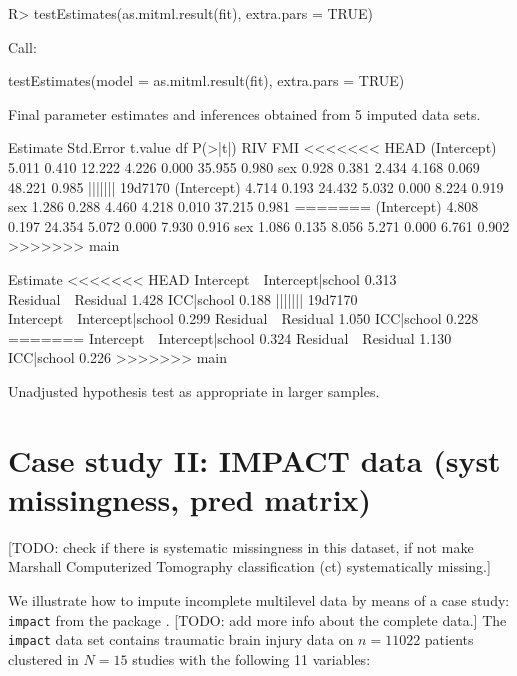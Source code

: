 \documentclass[
]{jss}
\begin{document}
\begin{CodeChunk}
\begin{CodeInput}
R> testEstimates(as.mitml.result(fit), extra.pars = TRUE)
\end{CodeInput}
\begin{CodeOutput}

Call:

testEstimates(model = as.mitml.result(fit), extra.pars = TRUE)

Final parameter estimates and inferences obtained from 5 imputed data sets.

             Estimate Std.Error   t.value        df   P(>|t|)       RIV       FMI 
<<<<<<< HEAD
(Intercept)     5.011     0.410    12.222     4.226     0.000    35.955     0.980 
sex             0.928     0.381     2.434     4.168     0.069    48.221     0.985 
||||||| 19d7170
(Intercept)     4.714     0.193    24.432     5.032     0.000     8.224     0.919 
sex             1.286     0.288     4.460     4.218     0.010    37.215     0.981 
=======
(Intercept)     4.808     0.197    24.354     5.072     0.000     7.930     0.916 
sex             1.086     0.135     8.056     5.271     0.000     6.761     0.902 
>>>>>>> main

                            Estimate 
<<<<<<< HEAD
Intercept~~Intercept|school    0.313 
Residual~~Residual             1.428 
ICC|school                     0.188 
||||||| 19d7170
Intercept~~Intercept|school    0.299 
Residual~~Residual             1.050 
ICC|school                     0.228 
=======
Intercept~~Intercept|school    0.324 
Residual~~Residual             1.130 
ICC|school                     0.226 
>>>>>>> main

Unadjusted hypothesis test as appropriate in larger samples.
\end{CodeOutput}
\end{CodeChunk}

\hypertarget{case-study-ii-impact-data-syst-missingness-pred-matrix}{%
\section{Case study II: IMPACT data (syst missingness, pred
matrix)}\label{case-study-ii-impact-data-syst-missingness-pred-matrix}}

{[}TODO: check if there is systematic missingness in this dataset, if
not make Marshall Computerized Tomography classification (ct)
systematically missing.{]}

We illustrate how to impute incomplete multilevel data by means of a
case study: \texttt{impact} from the  package
\citep[empirical data on traumatic brain injuries, \(n = 11,022\) units
across \(N = 15\) clusters,][]{metamisc}. {[}TODO: add more info about
the complete data.{]} The \texttt{impact} data set contains traumatic
brain injury data on \(n = 11022\) patients clustered in \(N = 15\)
studies with the following 11 variables:
\end{document}

